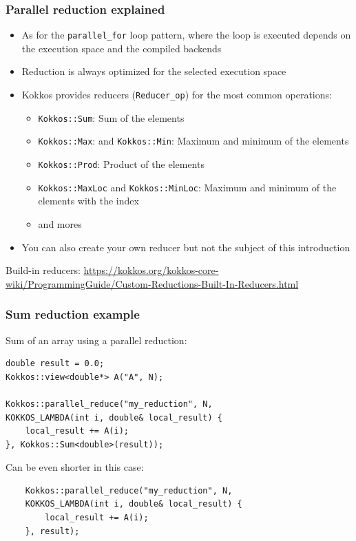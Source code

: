 \documentclass[aspectratio=169]{beamer}
\begin{document}

\begin{frame}[fragile]
    \frametitle{Parallel reduction explained}

\begin{itemize}
    \item As for the \texttt{parallel\_for} loop pattern, where the loop is executed depends on the execution space and the compiled backends
    \item Reduction is always optimized for the selected execution space
    \item Kokkos provides reducers (\texttt{Reducer\_op}) for the most common operations:
    \begin{itemize}
        \item \texttt{Kokkos::Sum}: Sum of the elements
        \item \texttt{Kokkos::Max}: and \texttt{Kokkos::Min}: Maximum and minimum of the elements
        \item \texttt{Kokkos::Prod}: Product of the elements
        \item \texttt{Kokkos::MaxLoc} and \texttt{Kokkos::MinLoc}: Maximum and minimum of the elements with the index
        \item and mores
    \end{itemize}  
    \item You can also create your own reducer but not the subject of this introduction
\end{itemize}

\begin{block}{}
    Build-in reducers: \href{https://kokkos.org/kokkos-core-wiki/ProgrammingGuide/Custom-Reductions-Built-In-Reducers.html}{https://kokkos.org/kokkos-core-wiki/ProgrammingGuide/Custom-Reductions-Built-In-Reducers.html}
\end{block}

\end{frame}


\begin{frame}[fragile]
    \frametitle{Sum reduction example}

Sum of an array using a parallel reduction:

\footnotesize
\begin{verbatim}
double result = 0.0;
Kokkos::view<double*> A("A", N);

Kokkos::parallel_reduce("my_reduction", N,
KOKKOS_LAMBDA(int i, double& local_result) {
    local_result += A(i);
}, Kokkos::Sum<double>(result));
\end{verbatim}

\normalsize
Can be even shorter in this case:

\footnotesize
\begin{verbatim}
    Kokkos::parallel_reduce("my_reduction", N,
    KOKKOS_LAMBDA(int i, double& local_result) {
        local_result += A(i);
    }, result);
    \end{verbatim}

\end{frame}
\end{document}
